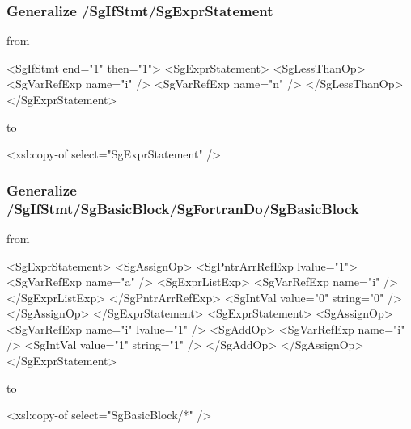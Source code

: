 \subsubsection{Generalize /SgIfStmt/SgExprStatement}\label{subsubsec:cond}


from

\begin{framed}
\begin{src}
<SgIfStmt end="1" then="1">
	<SgExprStatement>
		<SgLessThanOp>
			<SgVarRefExp name="i" />
			<SgVarRefExp name="n" />
		</SgLessThanOp>
	</SgExprStatement>
\end{src}
\end{framed}

to

\begin{framed}
\begin{src}
		<xsl:copy-of select="SgExprStatement" />
\end{src}
\end{framed}

\subsubsection{Generalize /SgIfStmt/SgBasicBlock/SgFortranDo/SgBasicBlock}


from

\begin{framed}
\begin{src}
				<SgExprStatement>
					<SgAssignOp>
						<SgPntrArrRefExp lvalue="1">
							<SgVarRefExp name="a" />
							<SgExprListExp>
								<SgVarRefExp name="i" />
							</SgExprListExp>
						</SgPntrArrRefExp>
						<SgIntVal value="0" string="0" />
					</SgAssignOp>
				</SgExprStatement>
				<SgExprStatement>
					<SgAssignOp>
						<SgVarRefExp name="i" lvalue="1" />
						<SgAddOp>
							<SgVarRefExp name="i" />
							<SgIntVal value="1" string="1" />
						</SgAddOp>
					</SgAssignOp>
				</SgExprStatement>
\end{src}
\end{framed}

to

\begin{framed}
\begin{src}
					<xsl:copy-of select="SgBasicBlock/*" />
\end{src}
\end{framed}

